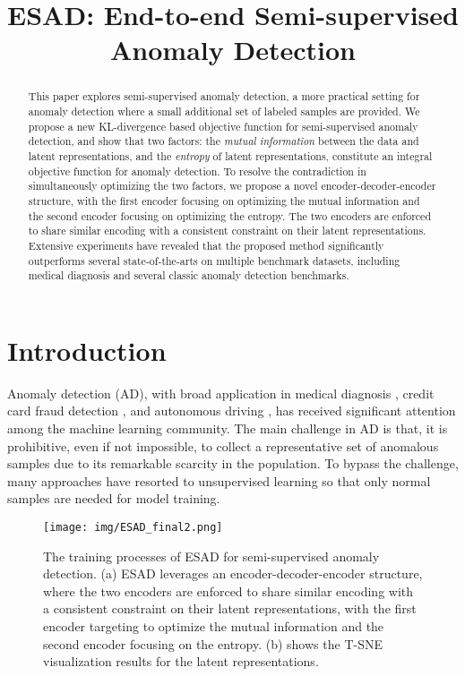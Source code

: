 \documentclass{bmvc2k}
\title{ESAD: End-to-end Semi-supervised Anomaly Detection}
\begin{document}
\maketitle

\begin{abstract}
This paper explores semi-supervised anomaly detection, a more practical setting for anomaly detection where a small additional set of labeled samples are provided. We propose a new KL-divergence based objective function for semi-supervised anomaly detection, and show that two factors: the \emph{mutual information} between the data and latent representations, and the \emph{entropy} of latent representations, constitute an integral objective function for anomaly detection. To resolve the contradiction in simultaneously optimizing the two factors, we propose a novel encoder-decoder-encoder structure, with the first encoder focusing on optimizing the mutual information and the second encoder focusing on optimizing the entropy. The two encoders are enforced to share similar encoding with a consistent constraint on their latent representations. Extensive experiments have revealed that the proposed method significantly outperforms several state-of-the-arts on multiple benchmark datasets, including medical diagnosis and several classic anomaly detection benchmarks. 
\end{abstract}

\section{Introduction}
\label{sec:intro}
Anomaly detection (AD), with broad application in medical diagnosis \cite{tuluptceva2020anomaly}, credit card fraud detection \cite{phua2010comprehensive}, and autonomous driving \cite{eykholt2018robust}, has received significant attention among the machine learning community. The main challenge in AD is that, it is prohibitive, even if not impossible, to collect a representative set of anomalous samples due to its remarkable scarcity in the population. To bypass the challenge, many approaches \cite{Sabokrou2018Adversarially,perera2019ocgan,zhang2020p} have resorted to unsupervised learning so that only normal samples are needed for model training.

\begin{figure}[t]
\centering
\texttt{[image: img/ESAD\_final2.png]}
\vspace{-18pt}
\caption{The training processes of ESAD for semi-supervised anomaly detection. (a) ESAD leverages an encoder-decoder-encoder structure, where the two encoders are enforced to share similar encoding with a consistent constraint on their latent representations, with the first encoder targeting to optimize the mutual information and the second encoder focusing on the entropy. (b) shows the T-SNE \cite{maaten2008visualizing} visualization results for the latent representations.}
\label{img:esad}
\vspace{-15pt}
\end{figure}
\end{document}
